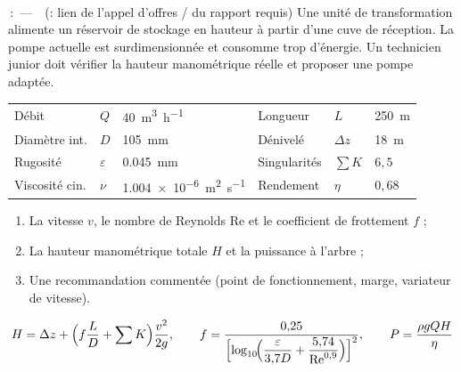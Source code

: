 \documentclass[10pt]{article}
\begin{document}
\astatus{\sRealistic}{\sRealisticNote}\\[-1pt]
{\monofont\tiny\MakeUppercase{\sSource}\,:\ ---\ \ (\sReal: lien de l'appel d'offres / du rapport requis)}
Une unité de transformation alimente un réservoir de stockage en hauteur à partir d'une cuve de réception. La pompe actuelle est surdimensionnée et consomme trop d'énergie. Un technicien junior doit vérifier la hauteur manométrique réelle et proposer une pompe adaptée.
{\small\begin{tabular}{@{}l@{\ }l@{\ }l@{\hspace{9mm}}l@{\ }l@{\ }l@{}}
Débit&$Q$&\SI{40}{\meter\cubed\per\hour}&Longueur&$L$&\SI{250}{\meter}\\
Diamètre int.&$D$&\SI{105}{\milli\meter}&Dénivelé&$\Delta z$&\SI{18}{\meter}\\
Rugosité&$\varepsilon$&\SI{0.045}{\milli\meter}&Singularités&$\sum K$&$6{,}5$\\
Viscosité cin.&$\nu$&\SI{1.004e-6}{\meter\squared\per\second}&Rendement&$\eta$&$0{,}68$\\
\end{tabular}}
\begin{enumerate}[nosep,leftmargin=*,label={\monofont\color{orange}\arabic*.}]
\item La vitesse $v$, le nombre de Reynolds $\mathrm{Re}$ et le coefficient de frottement $f$ ;
\item La hauteur manométrique totale $H$ et la puissance à l'arbre ;
\item Une recommandation commentée (point de fonctionnement, marge, variateur de vitesse).
\end{enumerate}
\[
H=\Delta z+\Bigl(f\frac{L}{D}+\sum K\Bigr)\frac{v^{2}}{2g},\qquad
f=\frac{0{,}25}{\Bigl[\log_{10}\!\Bigl(\dfrac{\varepsilon}{3{,}7D}+\dfrac{5{,}74}{\mathrm{Re}^{0{,}9}}\Bigr)\Bigr]^{2}},\qquad
P=\frac{\rho g Q H}{\eta}
\]
\end{document}
